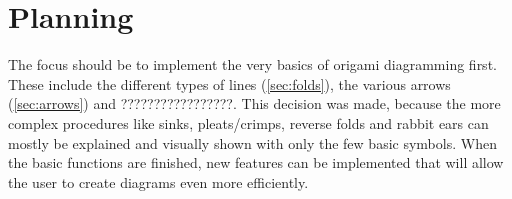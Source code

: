 
\section{Planning}

The focus should be to implement the very basics of origami diagramming first. These include the different types of lines (\ref{sec:folds}), the various arrows (\ref{sec:arrows}) and ?????????????????. This decision was made, because the more complex procedures like sinks, pleats/crimps, reverse folds and rabbit ears can mostly be explained and visually shown with only the few basic symbols.
When the basic functions are finished, new features can be implemented that will allow the user to create diagrams even more efficiently.